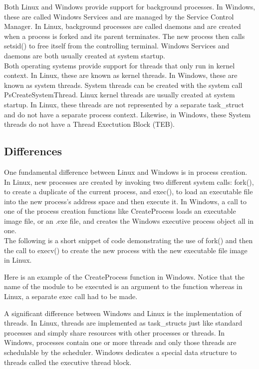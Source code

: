 \documentclass[letterpaper,10pt,titlepage]{article}
\begin{document}
\linebreak
Both Linux and Windows provide support for background processes. In Windows,
these are called Windows Services and are managed by the Service Control 
Manager. In Linux, background processes are called daemons and are created 
when a process is forked and its parent terminates. The new process then calls
setsid() to free itself from the controlling terminal. Windows Services and 
daemons are both usually created at system startup.
\\
\linebreak
Both operating systems provide support for threads that only run in kernel 
context. In Linux, these are known as kernel threads. In Windows, these are 
known as system threads. System threads can be created with the system call
PsCreateSystemThread. Linux kernel threads are usually created at system 
startup. In Linux, these threads are not represented by a separate task\_struct
and do not have a separate process context. Likewise, in Windows, these
System threads do not have a Thread Exectution Block (TEB).
\subsection{Differences}

One fundamental difference between Linux and Windows is in process creation. 
In Linux, new processes are created by invoking two different system calls:
fork(), to create a duplicate of the current process, and exec(), to load an
executable file into the new process's address space and then execute it. 
In Windows, a call to one of the process creation functions like CreateProcess
loads an executable image file, or an .exe file, and creates the Windows
executive process object all in one.
\\

The following is a short snippet of code demonstrating the use of fork() and
then the call to execv() to create the new process with the new executable
file image in Linux.



Here is an example of the CreateProcess function in Windows. Notice that the
name of the module to be executed is an argument to the function whereas in
Linux, a separate exec call had to be made.



A significant difference between Windows and Linux is the implementation of 
threads. In Linux, threads are implemented as task\_structs just like 
standard processes and simply share resources with other processes or threads.
In Windows, processes contain one or more threads and only those threads are
schedulable by the scheduler. Windows dedicates a special data structure to 
threads called the executive thread block. 
\\
\end{document}
